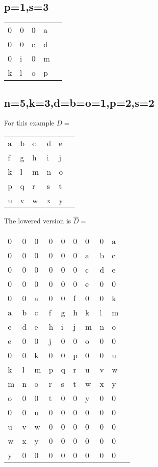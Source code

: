 \documentclass{article}
\begin{document}
\subsection{p=1,s=3}

\begin{table}[h]
\centering
\begin{tabular}{lllll}
0 & 0 & 0 & a \\
0 & 0 & c & d \\
0 & i & 0 & m \\
k & l & o & p
\end{tabular}
\end{table}

\subsection{n=5,k=3,d=b=o=1,p=2,s=2}

For this example $D = $

\begin{table}[h]
\centering
\begin{tabular}{llllll}
a & b & c & d & e \\
f & g & h & i & j \\
k & l & m & n & o \\
p & q & r & s & t \\
u & v & w & x & y
\end{tabular}
\end{table}

The lowered version is $\widehat{D} = $

\begin{table}[h]
\centering
\begin{tabular}{llllllllll}
0 & 0 & 0 & 0 & 0 & 0 & 0 & 0 & a \\
0 & 0 & 0 & 0 & 0 & 0 & a & b & c \\
0 & 0 & 0 & 0 & 0 & 0 & c & d & e \\
0 & 0 & 0 & 0 & 0 & 0 & e & 0 & 0 \\
0 & 0 & a & 0 & 0 & f & 0 & 0 & k \\
a & b & c & f & g & h & k & l & m \\
c & d & e & h & i & j & m & n & o \\
e & 0 & 0 & j & 0 & 0 & o & 0 & 0 \\
0 & 0 & k & 0 & 0 & p & 0 & 0 & u \\
k & l & m & p & q & r & u & v & w \\
m & n & o & r & s & t & w & x & y \\
o & 0 & 0 & t & 0 & 0 & y & 0 & 0 \\
0 & 0 & u & 0 & 0 & 0 & 0 & 0 & 0 \\
u & v & w & 0 & 0 & 0 & 0 & 0 & 0 \\
w & x & y & 0 & 0 & 0 & 0 & 0 & 0 \\
y & 0 & 0 & 0 & 0 & 0 & 0 & 0 & 0
\end{tabular}
\end{table}
\end{document}
